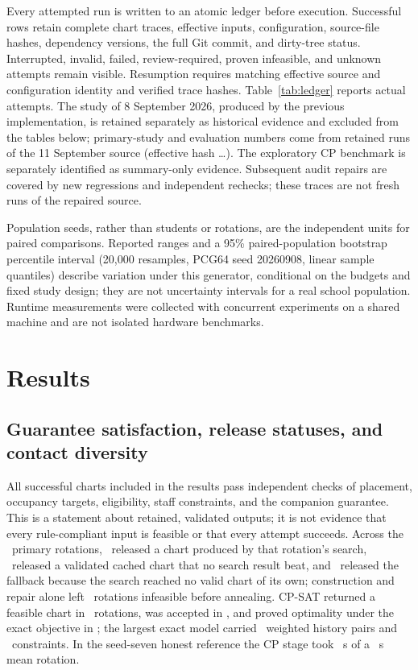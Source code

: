 \documentclass[11pt,a4paper]{article}
\theoremstyle{definition}\newtheorem{definition}[theorem]{Definition}
\theoremstyle{remark}\newtheorem{remark}[theorem]{Remark}
\begin{document}
Every attempted run is written to an atomic ledger before execution. Successful rows retain complete chart traces, effective inputs, configuration, source-file hashes, dependency versions, the full Git commit, and dirty-tree status. Interrupted, invalid, failed, review-required, proven infeasible, and unknown attempts remain visible. Resumption requires matching effective source and configuration identity and verified trace hashes. Table~\ref{tab:ledger} reports actual attempts. The study of 8 September 2026, produced by the previous implementation, is retained separately as historical evidence and excluded from the tables below; primary-study and evaluation numbers come from retained runs of the 11 September source (effective hash \SourceHash\ldots). The exploratory CP benchmark is separately identified as summary-only evidence. Subsequent audit repairs are covered by new regressions and independent rechecks; these traces are not fresh runs of the repaired source.


Population seeds, rather than students or rotations, are the independent units for paired comparisons. Reported ranges and a 95\% paired-population bootstrap percentile interval (20,000 resamples, PCG64 seed 20260908, linear sample quantiles) describe variation under this generator, conditional on the budgets and fixed study design; they are not uncertainty intervals for a real school population. Runtime measurements were collected with concurrent experiments on a shared machine and are not isolated hardware benchmarks.

\section{Results}\label{sec:results}
\subsection{Guarantee satisfaction, release statuses, and contact diversity}
All successful charts included in the results pass independent checks of placement, occupancy targets, eligibility, staff constraints, and the companion guarantee. This is a statement about retained, validated outputs; it is not evidence that every rule-compliant input is feasible or that every attempt succeeds. Across the \PrimaryRotations\ primary rotations, \ReleaseOptimized\ released a chart produced by that rotation's search, \ReleaseIncumbent\ released a validated cached chart that no search result beat, and \ReleaseFallback\ released the fallback because the search reached no valid chart of its own; construction and repair alone left \ConstructionInfeasibleRotations\ rotations infeasible before annealing. CP-SAT returned a feasible chart in \CpsatFeasibleRotations\ rotations, was accepted in \CpsatAcceptedRotations, and proved optimality under the exact objective in \ProvenOptimalRotations; the largest exact model carried \CpsatPairVarsMax\ weighted history pairs and \CpsatConstraintsMax\ constraints. In the seed-seven honest reference the CP stage took \CpsatMeanSeconds\ s of a \MeanSolveSeconds\ s mean rotation.
\end{document}
